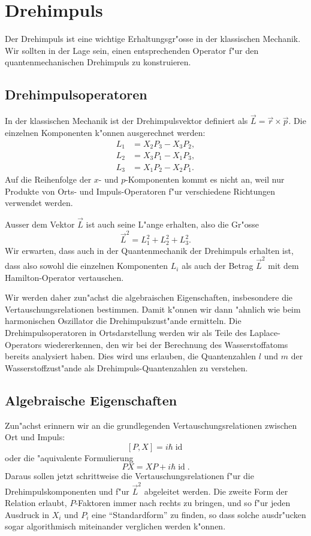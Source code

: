 \chapter{Drehimpuls\label{chapter:drehimpuls}}
\rhead{}
Der Drehimpuls ist eine wichtige Erhaltungsgr"osse in der klassischen
Mechanik. Wir sollten in der Lage sein, einen entsprechenden Operator
f"ur den quantenmechanischen Drehimpuls zu konstruieren.

\section{Drehimpulsoperatoren\label{section:drehimpulsoperatoren}}
In der klassischen Mechanik ist der Drehimpulsvektor definiert
als $\vec L=\vec r\times \vec p$. Die einzelnen Komponenten k"onnen
ausgerechnet werden:
\begin{align*}
L_1&=X_2P_3-X_3P_2,\\
L_2&=X_3P_1-X_1P_3,\\
L_3&=X_1P_2-X_2P_1.
\end{align*}
Auf die Reihenfolge der $x$- und $p$-Komponenten kommt es nicht an,
weil nur Produkte von Orts- und Impuls-Operatoren f"ur verschiedene
Richtungen verwendet werden.

Ausser dem Vektor $\vec L$ ist auch seine L"ange erhalten, also
die Gr"osse
\[
\vec L^2=L_1^2+L_2^2+L_3^2.
\]
Wir erwarten, dass auch in der Quantenmechanik der Drehimpuls
erhalten ist, dass also sowohl die einzelnen Komponenten $L_i$ 
als auch der Betrag $\vec L^2$ mit dem Hamilton-Operator vertauschen.

Wir werden daher zun"achst die algebraischen Eigenschaften, insbesondere
die Vertauschungsrelationen bestimmen. Damit k"onnen wir dann "ahnlich
wie beim harmonischen Oszillator die Drehimpulszust"ande ermitteln.
Die Drehimpulsoperatoren in Ortsdarstellung werden wir als Teile
des Laplace-Operators wiedererkennen, den wir bei der Berechnung
des Wasserstoffatoms bereits analysiert haben. Dies wird uns erlauben,
die Quantenzahlen $l$ und $m$ der Wasserstoffzust"ande als
Drehimpuls-Quantenzahlen zu verstehen.

\section{Algebraische Eigenschaften\label{section:drehimpulsalgebra}}
Zun"achst erinnern wir an die grundlegenden Vertauschungsrelationen zwischen
Ort und Impuls:
\[
[P,X]=i\hbar \operatorname{id}
\]
oder die "aquivalente Formulierung
\[
PX=XP+i\hbar \operatorname{id}.
\]
Daraus sollen jetzt schrittweise die Vertauschungsrelationen f"ur die
Drehimpulskomponenten und f"ur $\vec L^2$ abgeleitet werden.
Die zweite Form der Relation erlaubt, $P$-Faktoren immer nach rechts zu
bringen, und so f"ur jeden Ausdruck in $X_i$ und $P_i$ eine
``Standardform'' zu finden, so dass solche ausdr"ucken sogar algorithmisch
miteinander verglichen werden k"onnen.

